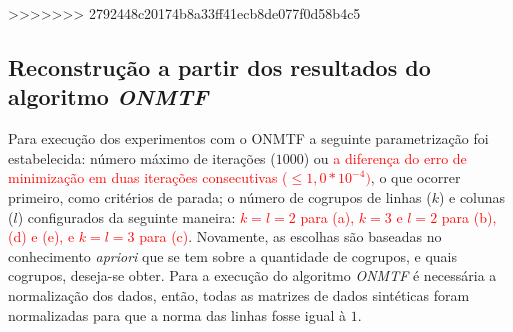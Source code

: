 \documentclass[
    12pt,                %
    oneside,            %
    a4paper,            %
    english,            %
    brazil                %
    ]{abntex2ppgsi}
\begin{document}

>>>>>>> 2792448c20174b8a33ff41ecb8de077f0d58b4c5

\subsection{Reconstrução a partir dos resultados do algoritmo \textit{ONMTF}}
\label{subsec:results-reconstruction-onmtf}


Para execução dos experimentos com o ONMTF a seguinte parametrização foi estabelecida: número máximo de iterações ($1000$) ou \textcolor{red}{a diferença do erro de minimização em duas iterações consecutivas ($\leq 1,0 * 10^{-4})$}, o que ocorrer primeiro, como critérios de parada; o número de cogrupos de linhas ($k$) e colunas ($l$) configurados da seguinte maneira: \textcolor{red}{$k = l = 2$ para (a), $k = 3$ e $l = 2$ para (b), (d) e (e), e $k = l = 3$ para (c)}. Novamente, as escolhas são baseadas no conhecimento \textit{apriori} que se tem sobre a quantidade de cogrupos, e quais cogrupos, deseja-se obter. Para a execução do algoritmo \textit{ONMTF} é necessária a normalização dos dados, então, todas as matrizes de dados sintéticas foram normalizadas para que a norma das linhas fosse igual à $1$.
\end{document}

